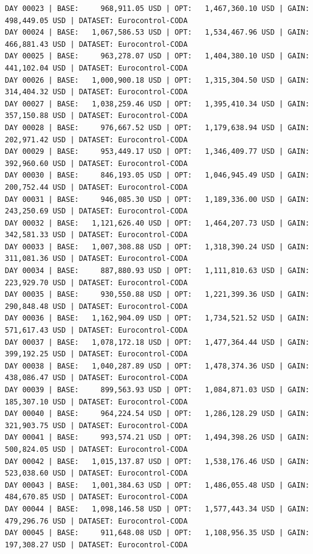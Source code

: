 \documentclass[11pt,a4paper]{article}
\begin{document}
\begin{verbatim}
DAY 00023 | BASE:     968,911.05 USD | OPT:   1,467,360.10 USD | GAIN: 498,449.05 USD | DATASET: Eurocontrol-CODA
DAY 00024 | BASE:   1,067,586.53 USD | OPT:   1,534,467.96 USD | GAIN: 466,881.43 USD | DATASET: Eurocontrol-CODA
DAY 00025 | BASE:     963,278.07 USD | OPT:   1,404,380.10 USD | GAIN: 441,102.04 USD | DATASET: Eurocontrol-CODA
DAY 00026 | BASE:   1,000,900.18 USD | OPT:   1,315,304.50 USD | GAIN: 314,404.32 USD | DATASET: Eurocontrol-CODA
DAY 00027 | BASE:   1,038,259.46 USD | OPT:   1,395,410.34 USD | GAIN: 357,150.88 USD | DATASET: Eurocontrol-CODA
DAY 00028 | BASE:     976,667.52 USD | OPT:   1,179,638.94 USD | GAIN: 202,971.42 USD | DATASET: Eurocontrol-CODA
DAY 00029 | BASE:     953,449.17 USD | OPT:   1,346,409.77 USD | GAIN: 392,960.60 USD | DATASET: Eurocontrol-CODA
DAY 00030 | BASE:     846,193.05 USD | OPT:   1,046,945.49 USD | GAIN: 200,752.44 USD | DATASET: Eurocontrol-CODA
DAY 00031 | BASE:     946,085.30 USD | OPT:   1,189,336.00 USD | GAIN: 243,250.69 USD | DATASET: Eurocontrol-CODA
DAY 00032 | BASE:   1,121,626.40 USD | OPT:   1,464,207.73 USD | GAIN: 342,581.33 USD | DATASET: Eurocontrol-CODA
DAY 00033 | BASE:   1,007,308.88 USD | OPT:   1,318,390.24 USD | GAIN: 311,081.36 USD | DATASET: Eurocontrol-CODA
DAY 00034 | BASE:     887,880.93 USD | OPT:   1,111,810.63 USD | GAIN: 223,929.70 USD | DATASET: Eurocontrol-CODA
DAY 00035 | BASE:     930,550.88 USD | OPT:   1,221,399.36 USD | GAIN: 290,848.48 USD | DATASET: Eurocontrol-CODA
DAY 00036 | BASE:   1,162,904.09 USD | OPT:   1,734,521.52 USD | GAIN: 571,617.43 USD | DATASET: Eurocontrol-CODA
DAY 00037 | BASE:   1,078,172.18 USD | OPT:   1,477,364.44 USD | GAIN: 399,192.25 USD | DATASET: Eurocontrol-CODA
DAY 00038 | BASE:   1,040,287.89 USD | OPT:   1,478,374.36 USD | GAIN: 438,086.47 USD | DATASET: Eurocontrol-CODA
DAY 00039 | BASE:     899,563.93 USD | OPT:   1,084,871.03 USD | GAIN: 185,307.10 USD | DATASET: Eurocontrol-CODA
DAY 00040 | BASE:     964,224.54 USD | OPT:   1,286,128.29 USD | GAIN: 321,903.75 USD | DATASET: Eurocontrol-CODA
DAY 00041 | BASE:     993,574.21 USD | OPT:   1,494,398.26 USD | GAIN: 500,824.05 USD | DATASET: Eurocontrol-CODA
DAY 00042 | BASE:   1,015,137.87 USD | OPT:   1,538,176.46 USD | GAIN: 523,038.60 USD | DATASET: Eurocontrol-CODA
DAY 00043 | BASE:   1,001,384.63 USD | OPT:   1,486,055.48 USD | GAIN: 484,670.85 USD | DATASET: Eurocontrol-CODA
DAY 00044 | BASE:   1,098,146.58 USD | OPT:   1,577,443.34 USD | GAIN: 479,296.76 USD | DATASET: Eurocontrol-CODA
DAY 00045 | BASE:     911,648.08 USD | OPT:   1,108,956.35 USD | GAIN: 197,308.27 USD | DATASET: Eurocontrol-CODA

\end{verbatim}
\end{document}
